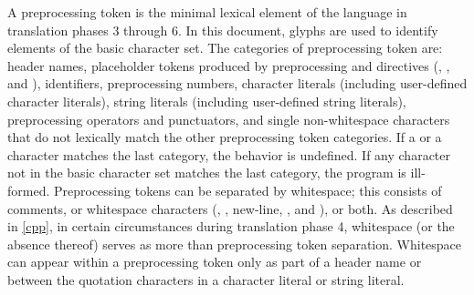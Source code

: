 \pnum
A preprocessing token is the minimal lexical element of the language in translation
phases 3 through 6.
In this document,
glyphs are used to identify
elements of the basic character set.
The categories of preprocessing token are: header names,
placeholder tokens produced by preprocessing  and  directives
(, , and ),
identifiers, preprocessing numbers, character literals (including user-defined character
literals), string literals (including user-defined string literals), preprocessing
operators and punctuators, and single non-whitespace characters that do not lexically
match the other preprocessing token categories.
If a  or a  character
matches the last category, the behavior is undefined.
If any character not in the basic character set matches the last category,
the program is ill-formed.
Preprocessing tokens can be separated by
%
whitespace;
%
this consists of comments, or whitespace characters
(,
,
new-line,
, and
), or both.
As described in \ref{cpp}, in certain
circumstances during translation phase 4, whitespace (or the absence
thereof) serves as more than preprocessing token separation. Whitespace
can appear within a preprocessing token only as part of a header name or
between the quotation characters in a character literal or
string literal.

